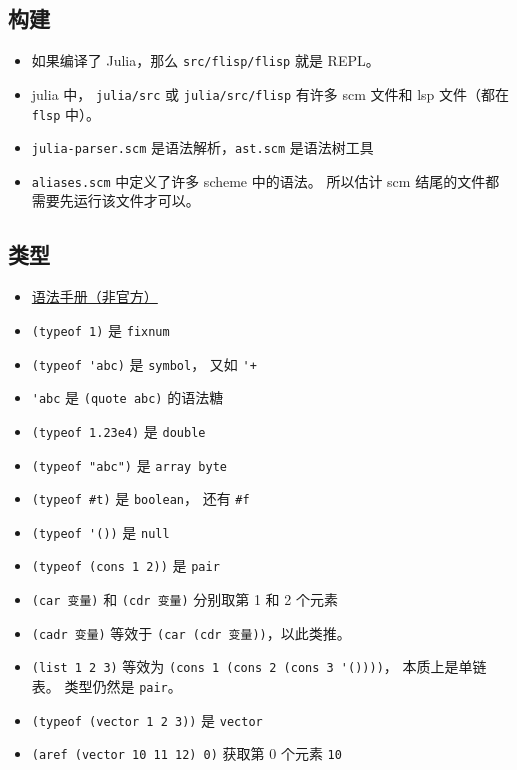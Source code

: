 
\subsection{构建}
\begin{itemize}
\item 如果编译了 Julia，那么 \verb`src/flisp/flisp` 就是 REPL。
\item julia 中， \verb`julia/src` 或 \verb`julia/src/flisp` 有许多 scm 文件和 lsp 文件（都在 \verb`flsp` 中）。
\item \verb`julia-parser.scm` 是语法解析，\verb`ast.scm` 是语法树工具
\item \verb`aliases.scm` 中定义了许多 scheme 中的语法。 所以估计 scm 结尾的文件都需要先运行该文件才可以。
\end{itemize}


\subsection{类型}
\begin{itemize}
\item \href{https://code.google.com/archive/p/femtolisp/wikis/Manual.wiki}{语法手册（非官方）}
\item \verb`(typeof 1)` 是 \verb`fixnum`
\item \verb`(typeof 'abc)` 是 \verb`symbol`， 又如 \verb`'+`
\item \verb`'abc` 是 \verb`(quote abc)` 的语法糖
\item \verb`(typeof 1.23e4)` 是 \verb`double`
\item \verb`(typeof "abc")` 是 \verb`array byte`
\item \verb`(typeof #t)` 是 \verb`boolean`， 还有 \verb`#f`
\item \verb`(typeof '())` 是 \verb`null`
\item \verb`(typeof (cons 1 2))` 是 \verb`pair`
\item \verb`(car 变量)` 和 \verb`(cdr 变量)` 分别取第 1 和 2 个元素
\item \verb`(cadr 变量)` 等效于 \verb`(car (cdr 变量))`，以此类推。
\item \verb`(list 1 2 3)` 等效为 \verb`(cons 1 (cons 2 (cons 3 '())))`， 本质上是单链表。 类型仍然是 \verb`pair`。
\item \verb`(typeof (vector 1 2 3))` 是 \verb`vector`
\item \verb`(aref (vector 10 11 12) 0)` 获取第 0 个元素 \verb`10`
\end{itemize}

